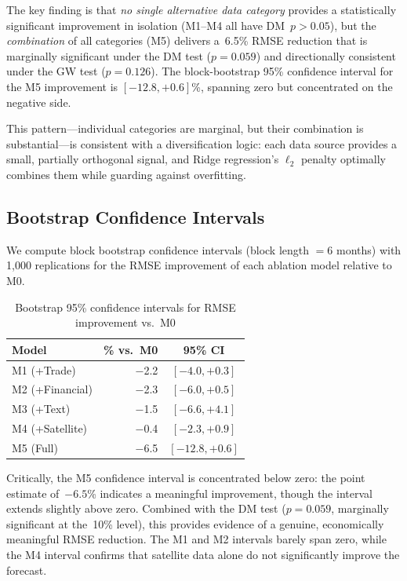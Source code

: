 The key finding is that \emph{no single alternative data category} provides a statistically significant improvement in isolation (M1--M4 all have DM~$p > 0.05$), but the \emph{combination} of all categories (M5) delivers a~6.5\% RMSE reduction that is marginally significant under the DM test ($p = 0.059$) and directionally consistent under the GW test ($p = 0.126$).  The block-bootstrap 95\% confidence interval for the M5 improvement is $[-12.8, +0.6]$\%, spanning zero but concentrated on the negative side.

This pattern---individual categories are marginal, but their combination is substantial---is consistent with a diversification logic: each data source provides a small, partially orthogonal signal, and Ridge regression's $\ell_2$ penalty optimally combines them while guarding against overfitting.

\subsection{Bootstrap Confidence Intervals}

We compute block bootstrap confidence intervals (block length $= 6$ months) with 1{,}000 replications for the RMSE improvement of each ablation model relative to M0.

\begin{table}[htbp]
\centering
\caption{Bootstrap 95\% confidence intervals for RMSE improvement vs.\ M0}
\label{tab:ch2_bootstrap}
\begin{tabular}{@{} l r c @{}}
\toprule
{Model} & {\% vs.\ M0} & {95\% CI} \\
\midrule
M1 (+Trade)     & $-$2.2 & $[-4.0, +0.3]$ \\
M2 (+Financial) & $-$2.3 & $[-6.0, +0.5]$ \\
M3 (+Text)      & $-$1.5 & $[-6.6, +4.1]$ \\
M4 (+Satellite) & $-$0.4 & $[-2.3, +0.9]$ \\
M5 (Full)       & $-$6.5 & $[-12.8, +0.6]$ \\
\bottomrule
\end{tabular}
\end{table}

Critically, the M5 confidence interval is concentrated below zero: the point estimate of~$-6.5$\% indicates a meaningful improvement, though the interval extends slightly above zero.  Combined with the DM test ($p = 0.059$, marginally significant at the~10\% level), this provides evidence of a genuine, economically meaningful RMSE reduction.  The M1 and M2 intervals barely span zero, while the M4 interval confirms that satellite data alone do not significantly improve the forecast.

